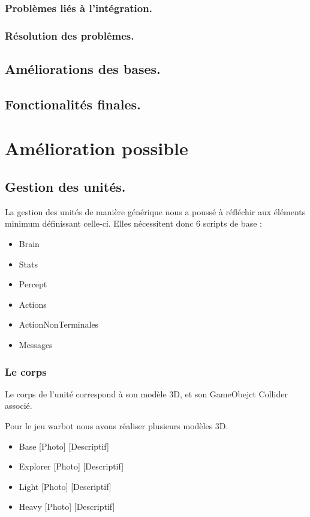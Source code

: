 \documentclass{report}
\begin{document}
\subsubsection{Problèmes liés à l'intégration.}
\subsubsection{Résolution des problêmes.}

\subsection{Améliorations des bases.}

\subsection{Fonctionalités finales.}

\section{Amélioration possible}

\subsection{Gestion des unités.}

La gestion des unités de manière générique nous a poussé à réfléchir aux éléments minimum définissant celle-ci.
Elles nécessitent donc 6 scripts de base : 
\begin{itemize}
\item Brain
\item Stats
\item Percept
\item Actions
\item ActionNonTerminales
\item Messages
\end{itemize}

\subsubsection{Le corps}

Le corps de l'unité correspond à son modèle 3D, et son GameObejct Collider associé.

Pour le jeu warbot nous avons réaliser plusieurs modèles 3D.
\begin{itemize}
\item Base
[Photo]
[Descriptif]
\item Explorer
[Photo]
[Descriptif]
\item Light
[Photo]
[Descriptif]
\item Heavy
[Photo]
[Descriptif]
\end{itemize}
\end{document}
